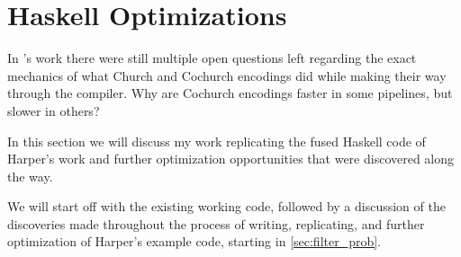 
\section{Haskell Optimizations}\label{sec:haskell}
In \cite{Harper2011}'s work there were still multiple open questions left regarding the exact mechanics of what Church and Cochurch encodings did while making their way through the compiler. Why are Cochurch encodings faster in some pipelines, but slower in others?

In this section we will discuss my work replicating the fused Haskell code of Harper's work and further optimization opportunities that were discovered along the way.

We will start off with the existing working code, followed by a discussion of the discoveries made throughout the process of writing, replicating, and further optimization of Harper's example code, starting in \autoref{sec:filter_prob}.

